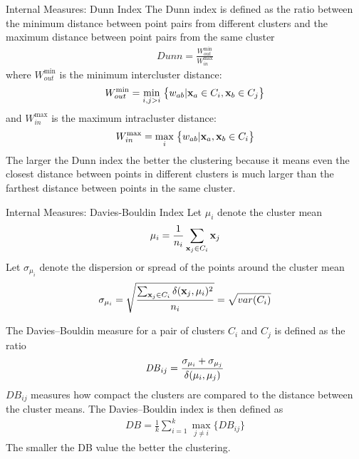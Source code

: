 \begin{frame}{Internal Measures: Dunn Index}
The Dunn index is def\/{i}ned as the ratio between the
minimum distance between point pairs from different clusters and
the maximum distance between point pairs from the same cluster
\begin{align*}
  Dunn = \frac{\displaystyle W_{out}^{\min}}{\displaystyle W_{in}^{\max}}
\end{align*}
where $W_{out}^{\min}$ is the minimum intercluster distance:
\begin{align*}
  \displaystyle
  W_{out}^{\min} = \min_{i, j>i} \; \bigl\{
  w_{ab} | \mathbf{x}_a \in C_i, \mathbf{x}_b \in C_{j}\bigr\}
\end{align*}
and $W_{in}^{\max}$ is the maximum intracluster distance:
\begin{align*}
  \displaystyle
  W_{in}^{\max} = \max_{i} \; \bigl\{ w_{ab} | \mathbf{x}_a,\mathbf{x}_b \in C_i   \bigr\}
\end{align*}
The larger the Dunn index the better the clustering because it means even
the closest distance between points in different clusters is much larger
than the farthest distance between points in the same cluster.
\end{frame}



\begin{frame}{Internal Measures: Davies-Bouldin Index}
Let $\mu_i$ denote the cluster mean
\begin{align*}
\mu_i = \frac{1}{n_i} \sum_{\mathbf{x}_{j} \in C_i} \mathbf{x}_{j}
\end{align*}
Let
$\sigma_{\mu_i}$ denote the dispersion or spread of the points around the cluster
mean
\begin{align*}
\sigma_{\mu_i} = \sqrt{\frac{\sum_{\mathbf{x}_{j} \in C_i} \delta(\mathbf{x}_{j},
\mu_i)^2}{n_i}} = \sqrt{var(C_i)}
\end{align*}

The Davies--Bouldin measure for a pair of clusters $C_i$ and $C_{j}$ is
def\/{i}ned as the ratio
\begin{align*}
\mathit{DB}_{ij} = \frac{\sigma_{\mu_i}+\sigma_{\mu_{j}}}{\delta(\mu_i,\mu_{j})}
\end{align*}
$\mathit{DB}_{ij}$ measures how compact the clusters are compared to the distance
between the cluster means.
The Davies--Bouldin index is then def\/{i}ned as
\begin{align*}
  \mathit{DB} = \frac{1}{k} \sum_{i=1}^k \max_{j\ne i} \{\mathit{DB}_{ij} \}
\end{align*}
The smaller the DB value the better the clustering.
\end{frame}


